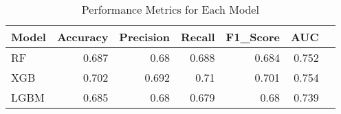 \begin{table}[H]
\caption{Performance Metrics for Each Model}
\label{Table 3 :performance_metrics}
\begin{tabular}{lrrrrrr}
\toprule
Model & Accuracy & Precision & Recall & F1\_Score & AUC \\
\midrule
RF & 0.687 & 0.68 & 0.688 & 0.684 & 0.752 \\
XGB & 0.702 & 0.692 & 0.71 & 0.701 & 0.754 \\
LGBM & 0.685 & 0.68 & 0.679 & 0.68 & 0.739 \\
\bottomrule
\end{tabular}
\end{table}
